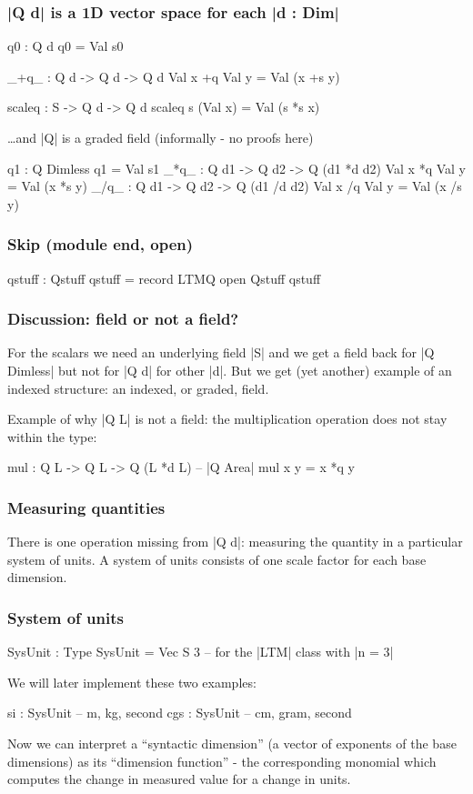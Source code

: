 \documentclass[aspectratio=169]{beamer}
\begin{document}
\begin{frame}
\frametitle{|Q d| is a 1D vector space for each |d : Dim|}
\begin{code}
    q0 : Q d
    q0 = Val s0

    _+q_ : Q d  -> Q d  -> Q d
    Val x +q Val y = Val (x +s y)

    scaleq : S -> Q d -> Q d
    scaleq s (Val x) = Val (s *s x)
\end{code}

\pause
\ldots and |Q| is a graded field (informally - no proofs here)
\begin{code}
    q1  : Q Dimless
    q1 = Val s1
    _*q_ : Q d1 -> Q d2 -> Q (d1 *d d2)
    Val x *q Val y = Val (x *s y)
    _/q_ : Q d1 -> Q d2 -> Q (d1 /d d2)
    Val x /q Val y = Val (x /s y)
\end{code}
\subsubsection{Skip (module end, open)}
\begin{code}
  qstuff : Qstuff
  qstuff = record { LTMQ }
  open Qstuff qstuff
\end{code}

\end{frame}
\begin{frame}
\frametitle{Discussion: field or not a field?}

For the scalars we need an underlying field |S| and we get a field
back for |Q Dimless| but not for |Q d| for other |d|. But we get (yet
another) example of an indexed structure: an indexed, or graded, field.

\pause
Example of why |Q L| is not a field: the multiplication operation
does not stay within the type:

\begin{code}
  mul : Q L -> Q L -> Q (L *d L) -- |Q Area|
  mul x y = x *q y
\end{code}

\end{frame}
\begin{frame}
\frametitle{Measuring quantities}

There is one operation missing from |Q d|: measuring the quantity in a
particular system of units. A system of units consists of one scale
factor for each base dimension.
\subsubsection{System of units}
\begin{code}
  SysUnit : Type
  SysUnit = Vec S 3   -- for the |LTM| class with |n = 3|
\end{code}
We will later implement these two examples:
\begin{spec}
  si   : SysUnit  -- m, kg, second
  cgs  : SysUnit  -- cm, gram, second
\end{spec}

Now we can interpret a ``syntactic dimension'' (a vector of exponents of
the base dimensions) as its ``dimension function'' - the corresponding
monomial which computes the change in measured value for a change in
units.
\end{frame}
\end{document}
